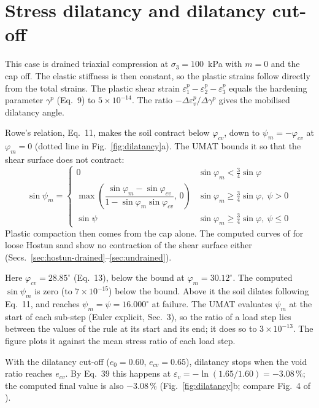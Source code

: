 \documentclass[11pt,a4paper]{article}
\begin{document}
\section{Stress dilatancy and dilatancy cut-off}

This case is drained triaxial compression at $\sigma_3 = 100$~kPa with $m = 0$ and the cap off. The
elastic stiffness is then constant, so the plastic strains follow directly from the total strains.
The plastic shear strain $\varepsilon_1^p - \varepsilon_2^p - \varepsilon_3^p$ equals the hardening
parameter $\gamma^p$ (Eq.~9) to $5\times10^{-14}$. The ratio
$-\Delta\varepsilon_v^p/\Delta\gamma^p$ gives the mobilised dilatancy angle.

Rowe's relation, Eq.~11, makes the soil contract below $\varphi_{cv}$, down to $\psi_m =
-\varphi_{cv}$ at $\varphi_m = 0$ (dotted line in Fig.~\ref{fig:dilatancy}a). The UMAT bounds it so
that the shear surface does not contract:
\begin{equation*}
  \sin\psi_m =
  \begin{cases}
    0 & \sin\varphi_m < \tfrac{3}{4}\sin\varphi \\[0.5ex]
    \max\left(\dfrac{\sin\varphi_m - \sin\varphi_{cv}}{1 - \sin\varphi_m\sin\varphi_{cv}},\, 0\right)
      & \sin\varphi_m \ge \tfrac{3}{4}\sin\varphi,\ \psi > 0 \\[1.5ex]
    \sin\psi & \sin\varphi_m \ge \tfrac{3}{4}\sin\varphi,\ \psi \le 0
  \end{cases}
\end{equation*}
Plastic compaction then comes from the cap alone. The computed curves of \citet{Schanz_1999} for loose Hostun
sand show no contraction of the shear surface either
(Secs.~\ref{sec:hostun-drained}--\ref{sec:undrained}).

Here $\varphi_{cv} = 28.85^\circ$ (Eq.~13), below the bound at $\varphi_m = 30.12^\circ$. The
computed $\sin\psi_m$ is zero (to $7\times10^{-15}$) below the bound. Above it the soil dilates
following Eq.~11, and reaches $\psi_m = \psi = 16.000^\circ$ at failure. The UMAT evaluates $\psi_m$
at the start of each sub-step (Euler explicit, Sec.~3), so the ratio of a load step lies between the
values of the rule at its start and its end; it does so to $3\times10^{-13}$. The figure plots it
against the mean stress ratio of each load step.

With the dilatancy cut-off ($e_0 = 0.60$, $e_{cv} = 0.65$), dilatancy stops when the void ratio
reaches $e_{cv}$. By Eq.~39 this happens at $\varepsilon_v = -\ln(1.65/1.60) = -3.08\,\%$; the
computed final value is also $-3.08\,\%$ (Fig.~\ref{fig:dilatancy}b; compare Fig.~4 of \citealp{Schanz_1999}).
\end{document}
